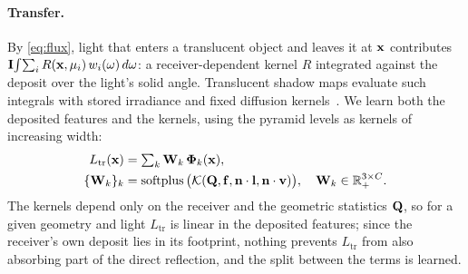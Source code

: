 \paragraph{Transfer.}
By \cref{eq:flux}, light that enters a translucent object and leaves it at $\mathbf{x}$ contributes $\mathbf{I}\!\int\!\sum_i R(\mathbf{x},\mu_i)\,w_i(\omega)\,d\omega$: a receiver-dependent kernel $R$ integrated against the deposit over the light's solid angle.
Translucent shadow maps evaluate such integrals with stored irradiance and fixed diffusion kernels~\cite{dachsbacher2003translucent,deon2007efficient,jimenez2010real}.
We learn both the deposited features and the kernels, using the pyramid levels as kernels of increasing width:
\begin{align}
  L_{\mathrm{tr}}(\mathbf{x})&=\textstyle\sum_{k}\mathbf{W}_k\,\boldsymbol\Phi_k(\mathbf{x}),\label{eq:transfer}\\
  \{\mathbf{W}_k\}_k&=\operatorname{softplus}\big(\mathcal K(\mathbf{Q},\mathbf{f},\mathbf{n}\cdot\mathbf{l},\mathbf{n}\cdot\mathbf{v})\big),\quad \mathbf{W}_k\in\mathbb R_+^{3\times C}.\nonumber
\end{align}
The kernels depend only on the receiver and the geometric statistics $\mathbf{Q}$, so for a given geometry and light $L_{\mathrm{tr}}$ is linear in the deposited features; since the receiver's own deposit lies in its footprint, nothing prevents $L_{\mathrm{tr}}$ from also absorbing part of the direct reflection, and the split between the terms is learned.

